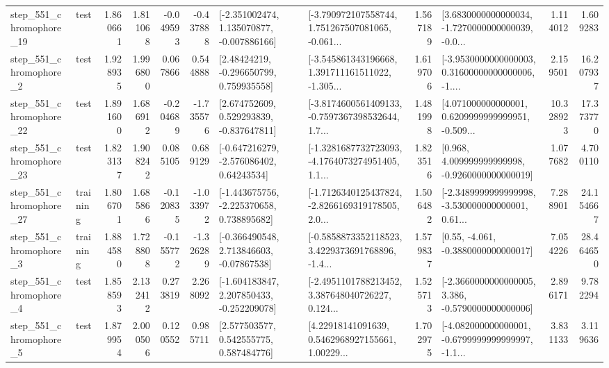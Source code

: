 \begin{tabular}{llrrrrllrlrr}
  step\_551\_chromophore\_19 &      test &      1.860661 &    1.811068 &     -0.049593 & -0.437888 &   [-2.351002474, 1.135070877, -0.007886166] &  [-3.790972107558744, 1.751267507081065, -0.061... &       1.567189 &  [3.6830000000000034, -1.7270000000000039, -0.0... &            1.114012 &          1.609283 \\
   step\_551\_chromophore\_2 &      test &      1.928935 &    1.996800 &      0.067866 &  0.544888 &     [2.48424219, -0.296650799, 0.759935558] &  [-3.545861343196668, 1.391711161511022, -1.305... &       1.619706 &  [-3.9530000000000003, 0.31600000000000006, -1.... &            2.159501 &         16.207937 \\
  step\_551\_chromophore\_22 &      test &      1.891600 &    1.686912 &     -0.204689 & -1.735576 &    [2.674752609, 0.529293839, -0.837647811] &  [-3.8174600561409133, -0.7597367398532644, 1.7... &       1.481998 &  [4.071000000000001, 0.6209999999999951, -0.509... &           10.328923 &         17.373770 \\
  step\_551\_chromophore\_23 &      test &      1.823137 &    1.908242 &      0.085105 &  0.689129 &    [-0.647216279, -2.576086402, 0.64243534] &  [-1.3281687732723093, -4.1764073274951405, 1.1... &       1.823516 &    [0.968, 4.009999999999998, -0.9260000000000019] &            1.077682 &          4.700110 \\
  step\_551\_chromophore\_27 &  training &      1.806701 &    1.685866 &     -0.120835 & -1.033972 &   [-1.443675756, -2.225370658, 0.738895682] &  [-1.7126340125437824, -2.8266169319178505, 2.0... &       1.506482 &  [-2.3489999999999998, -3.530000000000001, 0.61... &            7.288901 &         24.154667 \\
   step\_551\_chromophore\_3 &  training &      1.884580 &    1.728808 &     -0.155772 & -1.326289 &    [-0.366490548, 2.713846603, -0.07867538] &  [-0.5858873352118523, 3.4229373691768896, -1.4... &       1.579837 &                [0.55, -4.061, -0.3880000000000017] &            7.054226 &         28.464650 \\
   step\_551\_chromophore\_4 &      test &      1.858593 &    2.132412 &      0.273819 &  2.268092 &   [-1.604183847, 2.207850433, -0.252209078] &  [-2.4951101788213452, 3.387648040726227, 0.124... &       1.525713 &  [-2.3660000000000005, 3.386, -0.5790000000000006] &            2.896171 &          9.782294 \\
   step\_551\_chromophore\_5 &      test &      1.879954 &    2.000506 &      0.120552 &  0.985711 &     [2.577503577, 0.542555775, 0.587484776] &  [4.22918141091639, 0.5462968927155661, 1.00229... &       1.702975 &  [-4.082000000000001, -0.6799999999999997, -1.1... &            3.831133 &          3.119636 \\

\end{tabular}
